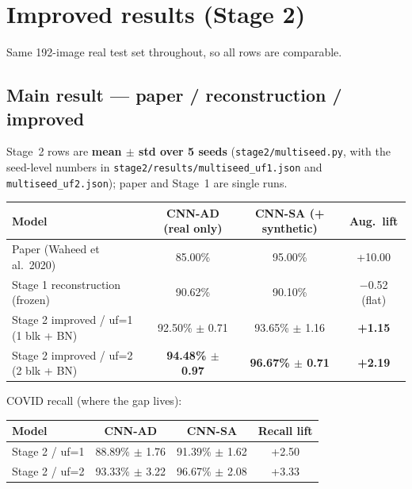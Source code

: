 \documentclass[11pt]{article}
\newcommand{\code}[1]{\texttt{#1}}
\begin{document}
\section{Improved results (Stage 2)}
\label{sec:improvedresults}

Same 192-image real test set throughout, so all rows are comparable.

\subsection{Main result --- paper / reconstruction / improved}
\label{sec:mainresult}
Stage~2 rows are \textbf{mean $\pm$ std over 5 seeds} (\code{stage2/multiseed.py},
with the seed-level numbers in \code{stage2/results/multiseed\_uf1.json} and
\code{multiseed\_uf2.json}); paper and Stage~1 are single runs.

\begin{table}[htbp]
\centering\small
\begin{tabular}{@{}lccc@{}}
\toprule
\textbf{Model} & \textbf{CNN-AD (real only)} & \textbf{CNN-SA (+ synthetic)} & \textbf{Aug.\ lift} \\
\midrule
Paper (Waheed et al.\ 2020) & 85.00\% & 95.00\% & +10.00 \\
Stage 1 reconstruction (frozen) & 90.62\% & 90.10\% & $-$0.52 (flat) \\
Stage 2 improved / uf=1 (1 blk + BN) & 92.50\% $\pm$ 0.71 & 93.65\% $\pm$ 1.16 & \textbf{+1.15} \\
Stage 2 improved / uf=2 (2 blk + BN) & \textbf{94.48\% $\pm$ 0.97} & \textbf{96.67\% $\pm$ 0.71} & \textbf{+2.19} \\
\bottomrule
\end{tabular}
\end{table}

COVID recall (where the gap lives):

\begin{table}[htbp]
\centering
\begin{tabular}{@{}lccc@{}}
\toprule
\textbf{Model} & \textbf{CNN-AD} & \textbf{CNN-SA} & \textbf{Recall lift} \\
\midrule
Stage 2 / uf=1 & 88.89\% $\pm$ 1.76 & 91.39\% $\pm$ 1.62 & +2.50 \\
Stage 2 / uf=2 & 93.33\% $\pm$ 3.22 & 96.67\% $\pm$ 2.08 & +3.33 \\
\bottomrule
\end{tabular}
\end{table}
\end{document}

